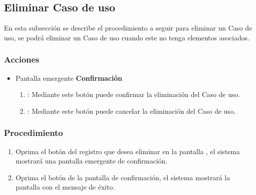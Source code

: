 \subsection{Eliminar Caso de uso}

En esta subsección se describe el procedimiento a seguir para eliminar un Caso de uso, se podrá eliminar un Caso de uso cuando este no tenga elementos asociados.


\subsubsection{Acciones}
\begin{itemize}
  \item Pantalla emergente \textbf{Confirmación}
  \begin{enumerate}
	\item {}: Mediante este botón puede confirmar la eliminación del Caso de uso.
	\item {}: Mediante este botón puede cancelar la eliminación del Caso de uso.
  \end{enumerate}
\end{itemize}


\subsubsection{Procedimiento}
\begin{enumerate}
	\item Oprima el botón \btnEliminar del registro que desea eliminar en la pantalla , el sistema mostrará una pantalla emergente de confirmación.
	
	\item Oprima el botón  de la pantalla de confirmación, el sistema mostrará la pantalla  con el mensaje de éxito.
\end{enumerate}


